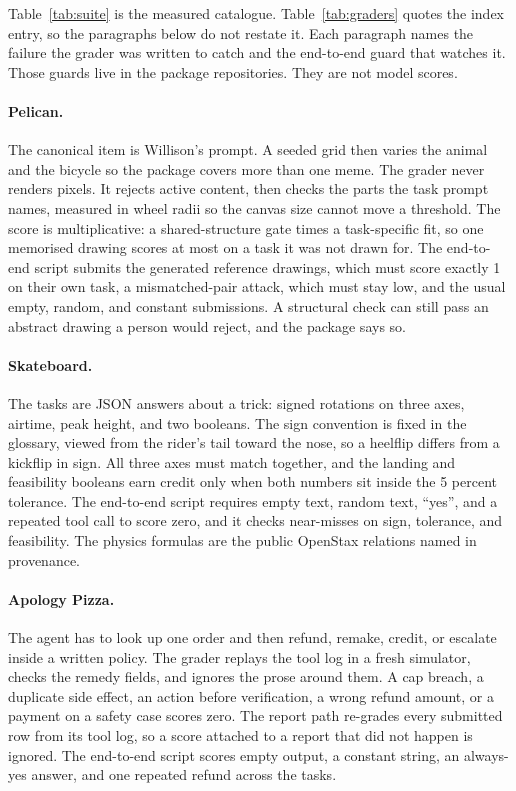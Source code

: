 Table~\ref{tab:suite} is the measured catalogue. Table~\ref{tab:graders} quotes the index entry, so the paragraphs below do not restate it. Each paragraph names the failure the grader was written to catch and the end-to-end guard that watches it. Those guards live in the package repositories. They are not model scores.

\paragraph{Pelican.}
The canonical item is Willison's prompt. A seeded grid then varies the animal and the bicycle so the package covers more than one meme. The grader never renders pixels. It rejects active content, then checks the parts the task prompt names, measured in wheel radii so the canvas size cannot move a threshold. The score is multiplicative: a shared-structure gate times a task-specific fit, so one memorised drawing scores at most \notePelicanMemoCap{} on a task it was not drawn for. The end-to-end script submits the generated reference drawings, which must score exactly 1 on their own task, a mismatched-pair attack, which must stay low, and the usual empty, random, and constant submissions. A structural check can still pass an abstract drawing a person would reject, and the package says so.

\paragraph{Skateboard.}
The tasks are JSON answers about a trick: signed rotations on three axes, airtime, peak height, and two booleans. The sign convention is fixed in the glossary, viewed from the rider's tail toward the nose, so a heelflip differs from a kickflip in sign. All three axes must match together, and the landing and feasibility booleans earn credit only when both numbers sit inside the 5 percent tolerance. The end-to-end script requires empty text, random text, ``yes'', and a repeated tool call to score zero, and it checks near-misses on sign, tolerance, and feasibility. The physics formulas are the public OpenStax relations named in provenance.

\paragraph{Apology Pizza.}
The agent has to look up one order and then refund, remake, credit, or escalate inside a written policy. The grader replays the tool log in a fresh simulator, checks the remedy fields, and ignores the prose around them. A cap breach, a duplicate side effect, an action before verification, a wrong refund amount, or a payment on a safety case scores zero. The report path re-grades every submitted row from its tool log, so a score attached to a report that did not happen is ignored. The end-to-end script scores empty output, a constant string, an always-yes answer, and one repeated refund across the tasks.

